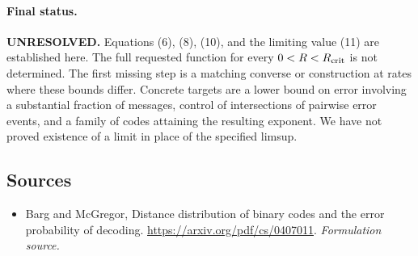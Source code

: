 \documentclass[11pt]{article}
\begin{document}
\paragraph{Final status.}
\textbf{UNRESOLVED.} Equations (6), (8), (10), and the limiting value
(11) are established here. The full requested function for every
$0<R<R_{\rm crit}$ is not determined. The first missing step is a
matching converse or construction at rates where these bounds differ.
Concrete targets are a lower bound on error involving a substantial
fraction of messages, control of intersections of pairwise error events,
and a family of codes attaining the resulting exponent. We have not
proved existence of a limit in place of the specified limsup.

\subsection{Sources}
\begin{itemize}
\item[S1]Barg and McGregor, Distance distribution of binary codes and the error probability of decoding.
\url{https://arxiv.org/pdf/cs/0407011}.
\textit{Formulation source.}
\end{itemize}
\end{document}
